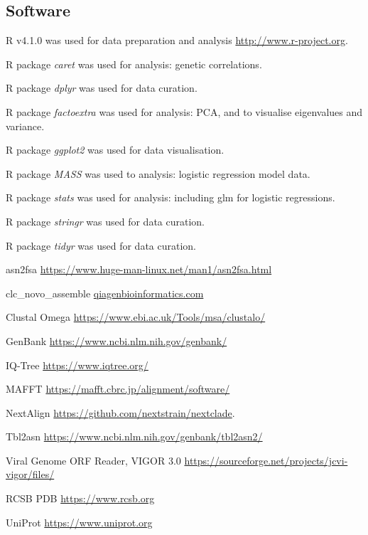 \documentclass{article} %
\begin{document}
\subsection{Software}
\begin{description}[noitemsep]

\item R v4.1.0 was used for data preparation and analysis \url{http://www.r-project.org}.
\item R package \textit{caret} was used for analysis: genetic correlations.
\item R package \textit{dplyr} was used for data curation.
\item R package \textit{factoextra} was used for analysis: PCA, and to visualise eigenvalues and variance.
\item R package \textit{ggplot2} was used for data visualisation.
\item R package \textit{MASS} was used to analysis: logistic regression model data.
\item R package \textit{stats} was used for analysis: including glm for logistic regressions. 
\item R package \textit{stringr} was used for data curation.
\item R package \textit{tidyr} was used for data curation.
\item asn2fsa \url{https://www.huge-man-linux.net/man1/asn2fsa.html}
\item clc\_novo\_assemble \href{https://resources.qiagenbioinformatics.com/manuals
/clcgenomicsworkbench/852/index.php?manual=De_novo_assembly.html}{qiagenbioinformatics.com} \
\item Clustal Omega \url{https://www.ebi.ac.uk/Tools/msa/clustalo/}
\item GenBank \url{https://www.ncbi.nlm.nih.gov/genbank/}
\item IQ-Tree \url{https://www.iqtree.org/}
\item MAFFT \url{https://mafft.cbrc.jp/alignment/software/} \cite{katoh2013mafft}
\item  NextAlign \href{https://github.com/nextstrain/nextclade}{https://github.com/nextstrain/nextclade}.
\item Tbl2asn \url{https://www.ncbi.nlm.nih.gov/genbank/tbl2asn2/}
\item Viral Genome ORF Reader, VIGOR 3.0 \url{https://sourceforge.net/projects/jcvi-vigor/files/}
\item RCSB PDB	\url{https://www.rcsb.org}
\item UniProt	\url{https://www.uniprot.org}

\end{description}
\end{document}
